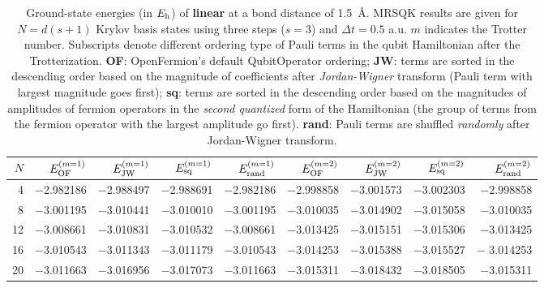 \documentclass[journal=jctcce,manuscript=article]{achemso}
\newcommand*{\Eh}{$E_{\rm h}$\xspace}
\newcommand{\methodabbr}[0]{MRSQK\xspace}
\begin{document}
\begin{table}[!ht]
\centering
\renewcommand{\arraystretch}{1.1}
\caption{Ground-state energies (in \Eh) of \textbf{linear } at a bond distance of 1.5~\AA{}. \methodabbr results are given for $N = d (s+1)$ Krylov basis states using three steps ($s = 3$) and $\Delta t = 0.5$ a.u.
$m$ indicates the Trotter number.
Subscripts denote different ordering type of Pauli terms in the qubit Hamiltonian after the Trotterization. 
\textbf{OF}: OpenFermion's default QubitOperator ordering; 
\textbf{JW}: terms are sorted in the descending order based on the magnitude of coefficients after \textit{Jordan-Wigner} transform (Pauli term with largest magnitude goes first);
\textbf{sq}: terms are sorted in the descending order based on the magnitudes of amplitudes of fermion operators in the \textit{second quantized} form of the Hamiltonian (the group of terms from the fermion operator with the largest amplitude go first).
\textbf{rand}: Pauli terms are shuffled \textit{randomly} after Jordan-Wigner transform.
}
\footnotesize
\begin{tabular*}{\columnwidth}{@{\extracolsep{\fill}}*{1}{r}*{8}{r}@{}}    %
 \hline
 \toprule
     $N$    &    $E^{(m=1)}_{\rm{OF}}$    &    $E^{(m=1)}_{\rm{JW}}$    &    $E^{(m=1)}_{\rm{sq}}$    &    $E^{(m=1)}_{\rm{rand}}$     &     $E^{(m=2)}_{\rm{OF}}$    &    $E^{(m=2)}_{\rm{JW}}$     &   $E^{(m=2)}_{\rm{sq}}$    &     $E^{(m=2)}_{\rm{rand}}$       \\
\midrule
    4    &    $-$2.982186    &    $-$2.988497   &   $-$2.988691   &   $-$2.982186   &    $-$2.998858   &    $-$3.001573    &  $-$3.002303    &   $-$2.998858  \\
    8    &    $-$3.001195	  &    $-$3.010441   &   $-$3.010010   &   $-$3.001195   &    $-$3.010035   &    $-$3.014902     &  $-$3.015058   &   $-$3.010035  \\	
  12    &    $-$3.008661	  &    $-$3.010831   &   $-$3.010532   &   $-$3.008661   &    $-$3.013425   &    $-$3.015151   &   $-$3.015306    &   $-$3.013425  \\
  16    &    $-$3.010543	  &    $-$3.011343   &   $-$3.011179   &   $-$3.010543   &    $-$3.014253   &    $-$3.015388   &   $-$3.015527    &   $-$ 3.014253  \\
  20    &    $-$3.011663    &    $-$3.016956   &   $-$3.017073   &    $-$3.011663  &    $-$3.015311   &    $-$3.018432   &    $-$3.018505   &    $-$3.015311  \\

\end{tabular*}
\end{table}
\end{document}
